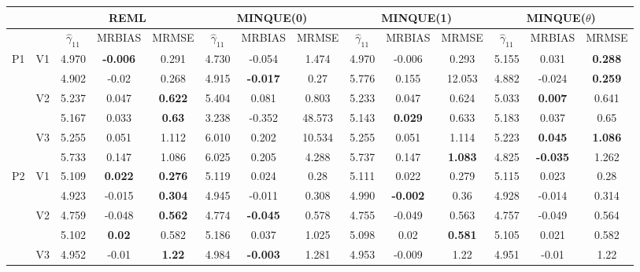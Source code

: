 \documentclass[12pt,a4paper]{article}
\begin{document}
\begin{sidewaystable}[ht]
\centering
{\footnotesize
\begin{tabular}{cc|ccc|ccc|ccc|ccc|}
   & & \multicolumn{3}{c|}{REML}&\multicolumn{3}{c|}{MINQUE(0)}&\multicolumn{3}{c|}{MINQUE(1)}&\multicolumn{3}{c|}{MINQUE($\theta$)}\\ \hline
 &  & $\hat{\gamma}_{11}$ & MRBIAS & MRMSE & $\hat{\gamma}_{11}$ & MRBIAS & MRMSE & $\hat{\gamma}_{11}$ & MRBIAS & MRMSE & $\hat{\gamma}_{11}$ & MRBIAS & MRMSE \\ 
  \hline
\multirow{6}{*}{P1} & \multirow{2}{*}{V1} & 4.970 & \textbf{-0.006} & 0.291 & 4.730 & -0.054 & 1.474 & 4.970 & -0.006 & 0.293 & 5.155 & 0.031 & \textbf{0.288} \\ 
   &  & 4.902 & -0.02 & 0.268 & 4.915 & \textbf{-0.017} & 0.27 & 5.776 & 0.155 & 12.053 & 4.882 & -0.024 & \textbf{0.259} \\ 
   & \multirow{2}{*}{V2} & 5.237 & 0.047 & \textbf{0.622} & 5.404 & 0.081 & 0.803 & 5.233 & 0.047 & 0.624 & 5.033 & \textbf{0.007} & 0.641 \\ 
   &  & 5.167 & 0.033 & \textbf{0.63} & 3.238 & -0.352 & 48.573 & 5.143 & \textbf{0.029} & 0.633 & 5.183 & 0.037 & 0.65 \\ 
   & \multirow{2}{*}{V3} & 5.255 & 0.051 & 1.112 & 6.010 & 0.202 & 10.534 & 5.255 & 0.051 & 1.114 & 5.223 & \textbf{0.045} & \textbf{1.086} \\ 
   &  & 5.733 & 0.147 & 1.086 & 6.025 & 0.205 & 4.288 & 5.737 & 0.147 & \textbf{1.083} & 4.825 & \textbf{-0.035} & 1.262 \\ 
   \hline \hline\multirow{6}{*}{P2} & \multirow{2}{*}{V1} & 5.109 & \textbf{0.022} & \textbf{0.276} & 5.119 & 0.024 & 0.28 & 5.111 & 0.022 & 0.279 & 5.115 & 0.023 & 0.28 \\ 
   &  & 4.923 & -0.015 & \textbf{0.304} & 4.945 & -0.011 & 0.308 & 4.990 & \textbf{-0.002} & 0.36 & 4.928 & -0.014 & 0.314 \\ 
   & \multirow{2}{*}{V2} & 4.759 & -0.048 & \textbf{0.562} & 4.774 & \textbf{-0.045} & 0.578 & 4.755 & -0.049 & 0.563 & 4.757 & -0.049 & 0.564 \\ 
   &  & 5.102 & \textbf{0.02} & 0.582 & 5.186 & 0.037 & 1.025 & 5.098 & 0.02 & \textbf{0.581} & 5.105 & 0.021 & 0.582 \\ 
   & \multirow{2}{*}{V3} & 4.952 & -0.01 & \textbf{1.22} & 4.984 & \textbf{-0.003} & 1.281 & 4.953 & -0.009 & 1.22 & 4.951 & -0.01 & 1.22 \\ 

\end{tabular}}
\end{sidewaystable}
\end{document}
